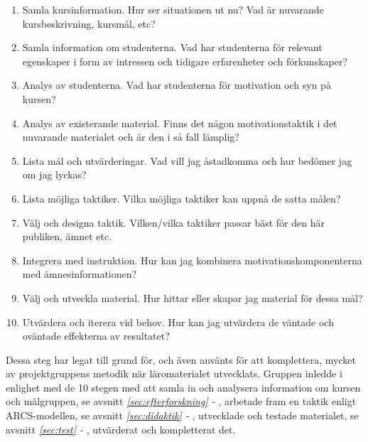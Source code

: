 \documentclass[12pt,a4paper,twoside,openright]{article}
\begin{document}
\begin{enumerate}
\item Samla kursinformation. Hur ser situationen ut nu? Vad är
 nuvarande kursbeskrivning, kursmål, etc?

\item Samla information om studenterna. Vad har studenterna
 för relevant egenskaper i form av intressen och tidigare
 erfarenheter och förkunskaper?

\item Analys av studenterna. Vad har studenterna för motivation och
 syn på kursen?

\item Analys av existerande material. Finns det någon
 motivationstaktik i det nuvarande materialet och är den i så fall
 lämplig?

\item Lista mål och utvärderingar. Vad vill jag åstadkomma och hur
 bedömer jag om jag lyckas?

\item Lista möjliga taktiker. Vilka möjliga taktiker kan uppnå de
 satta målen?

\item Välj och designa taktik. Vilken/vilka taktiker passar bäst för
 den här publiken, ämnet etc.

\item Integrera med instruktion. Hur kan jag kombinera
 motivationskomponenterna med ämnesinformationen?

\item Välj och utveckla material. Hur hittar eller skapar jag material
 för dessa mål?

\item Utvärdera och iterera vid behov. Hur kan jag utvärdera de
 väntade och oväntade effekterna av resultatet?

\end{enumerate}

Dessa steg har legat till grund för, och även använts för att
komplettera, mycket av projektgruppens metodik när läromaterialet
utvecklats. Gruppen inledde i enlighet med de 10 stegen med att samla
in och analysera information om kursen och målgruppen, se avsnitt
\textit{\ref{sec:efterforskning} - },
arbetade fram en taktik enligt ARCS-modellen, se avsnitt \textit{\ref{sec:didaktik}
- }, utvecklade och testade materialet, se avsnitt \textit{\ref{sec:test}
- }, utvärderat och kompletterat det.
\end{document}
